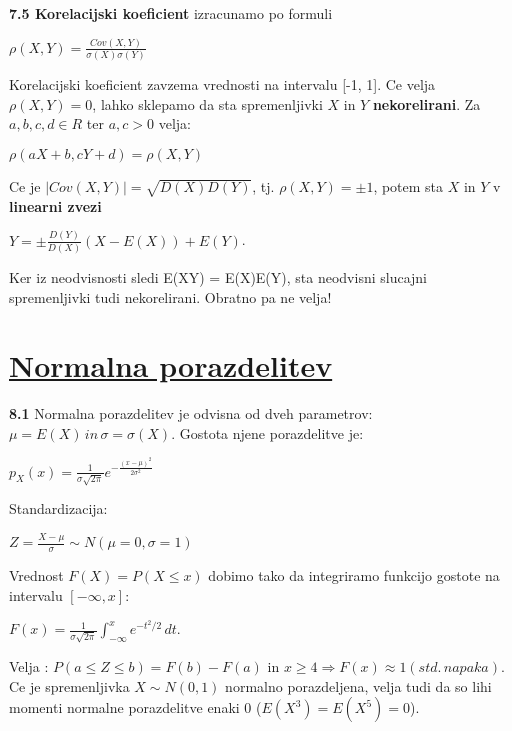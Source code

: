 \documentclass{article}
\begin{document}
\begin{multicols}{2}
	\textbf{7.5 Korelacijski koeficient} izracunamo po formuli
	\begin{center}
		\begin{math}
			\rho(X,Y) = \frac{Cov(X,Y)}
			{\sigma(X) \sigma(Y)}
		\end{math}
	\end{center}
	Korelacijski koeficient zavzema vrednosti na intervalu [-1, 1].
	Ce velja $\rho(X, Y) = 0$, lahko sklepamo da sta spremenljivki $X$ in $Y$ \textbf{nekorelirani}.
	Za $a, b, c, d \in R$ ter $a, c > 0$ velja:
	\begin{center}
		$\rho(aX + b, cY + d) = \rho(X, Y)$
	\end{center}
	Ce je $|Cov(X, Y)| = \sqrt{D(X)D(Y)}$, tj. $\rho(X, Y) = \pm 1$, potem sta $X$ in $Y$ v \textbf{linearni zvezi}
	\begin{center}
		\begin{math}
			Y = \pm \frac{D(Y)}{D(X)}(X - E(X)) + E(Y)
		\end{math}.
	\end{center}
	Ker iz neodvisnosti sledi E(XY) = E(X)E(Y), sta neodvisni slucajni spremenljivki tudi nekorelirani. Obratno
	pa ne velja!

	\section{\underline{Normalna porazdelitev}}

	\textbf{8.1} Normalna porazdelitev je odvisna od dveh parametrov:
	$\mu = E(X)\, in\, \sigma = \sigma(X)$. Gostota njene porazdelitve je:
	\begin{center}
		\begin{math}
			p_{X}(x) = \frac{1}{\sigma \sqrt{2 \pi}} e^{- \frac{(x - \mu)^{2}}{2 \sigma^{2}}}
		\end{math}
	\end{center}
	Standardizacija:
	\begin{center}
		\begin{math}
			Z = \frac{X - \mu}{\sigma} \sim N(\mu =  0, \sigma = 1)
		\end{math}
	\end{center}
	Vrednost $F(X) = P(X \leq x)$ dobimo tako da integriramo
	funkcijo gostote na intervalu $[-\infty, x]$:
	\begin{center}
		\begin{math}
			F(x) = \frac{1}{\sigma \sqrt{2 \pi}} \int_{-\infty}^x e^{-t^2 / 2}\, dt
		\end{math}.
	\end{center}
	Velja : $P (a \leq Z \leq b) = F(b) - F(a)$ in $x \geq 4 \Rightarrow F(x) \approx 1 (std.\, napaka)$.\\
	Ce je spremenljivka $X \sim N(0,1)$ normalno porazdeljena, velja tudi da so lihi momenti normalne porazdelitve enaki 0 ($E(X^3) = E(X^5) = 0$).


\end{multicols}
\end{document}
